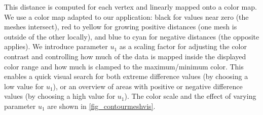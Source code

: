 %
This distance is computed for each vertex and linearly mapped onto a color map. 
%
We use a color map adapted to our application: black for values near zero (the
meshes intersect), red to yellow for growing positive distances (one mesh is
outside of the other locally), and blue to cyan for negative distances (the
opposite applies). We introduce parameter $u_1$ as a scaling factor for
adjusting the color contrast and controlling how much of the data is mapped
inside the displayed color range and how much is clamped to the maximum/minimum
color. This enables a quick visual search for both extreme difference values (by
choosing a low value for $u_1$), or an overview of areas with positive or
negative difference values (by choosing a high value for $u_1$). The color scale
and the effect of varying parameter $u_1$ are shown in
\cref{fig_contourmeshvis}.

